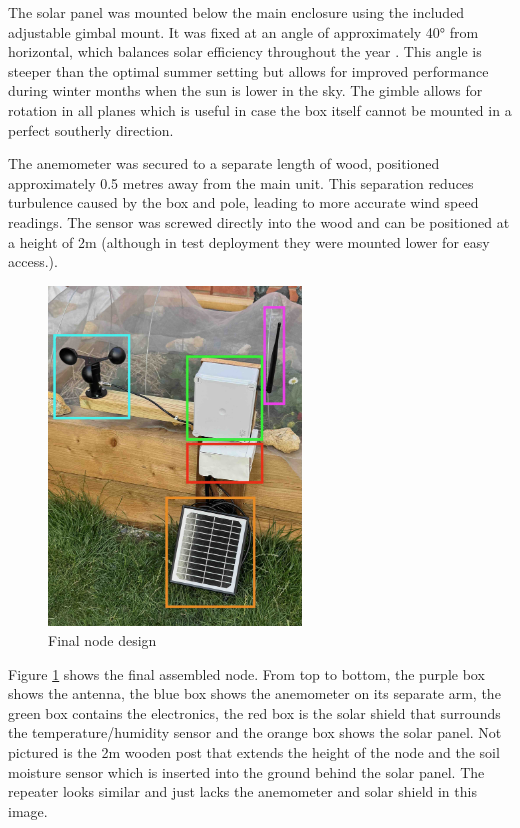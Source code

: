 The solar panel was mounted below the main enclosure using the included
adjustable gimbal mount. It was fixed at an angle of approximately 40° from
horizontal, which balances solar efficiency throughout the year
\cite{cathcart_best-solar-panel_2025}. This angle is steeper than the optimal
summer setting but allows for improved performance during winter months when the
sun is lower in the sky. The gimble allows for rotation in all planes which is
useful in case the box itself cannot be mounted in a perfect southerly
direction.

The anemometer was secured to a separate length of wood, positioned
approximately 0.5 metres away from the main unit. This separation reduces
turbulence caused by the box and pole, leading to more accurate wind speed
readings. The sensor was screwed directly into the wood and can be positioned at
a height of 2m (although in test deployment they were mounted lower for easy
access.).


\begin{figure}[H]
    \centering
    \includegraphics[width=0.6\textwidth]{contents/part-2/fig2/annotated-node.jpg}
    \caption{Final node design}
    \label{fig:assembled-node}
\end{figure}

Figure \ref{fig:assembled-node} shows the final assembled node. From top to
bottom, the purple box shows the antenna, the blue box shows the anemometer on
its separate arm, the green box contains the electronics, the red box is the
solar shield that surrounds the temperature/humidity sensor and the orange box
shows the solar panel. Not pictured is the 2m wooden post that extends the
height of the node and the soil moisture sensor which is inserted into the
ground behind the solar panel. The repeater looks similar and just lacks the
anemometer and solar shield in this image.

